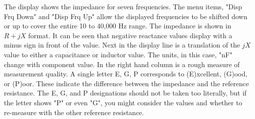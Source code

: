 %
The display shows the impedance for seven frequencies.
The menu items, "\textsf{Disp Frq Down}" and "\textsf{Disp Frq Up}" allow the displayed frequencies to be shifted down or up to cover the entire 10 to 40,000 Hz range.  The impedance is shown in  \(R+jX\) format. It can be seen that negative reactance values display with a minus sign in front of the value. Next in the display line is a translation of the  \(jX\) value to either a capacitance or inductor value. The units, in this case,  "\textsf{nF}" change with component value.  In the right hand column is a rough measure of measurement quality. A single letter \textsf{E, G, P} corresponds to (\textsf{E})xcellent, (\textsf{G})ood, or (\textsf{P})oor. These indicate the difference between the impedance and the reference resistance.
The \textsf{E}, \textsf{G}, and \textsf{P} designations should not be taken too literally, but if the letter shows "\textsf{P}" or even "\textsf{G}",  you might consider the values and whether to re-measure with the other reference resistance.

